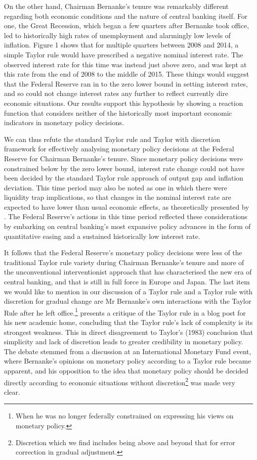 \documentclass[notitlepage,12pt]{article}
\begin{document}
On the other hand, Chairman Bernanke's tenure was remarkably different regarding both economic conditions and the nature of central banking itself.  For one, the Great Recession, which began a few quarters after Bernanke took office, led to historically high rates of unemployment and alarmingly low levels of inflation.  Figure 1 shows that for multiple quarters between 2008 and 2014, a simple Taylor rule would have prescribed a negative nominal interest rate.  The observed interest rate for this time was instead just above zero, and was kept at this rate from the end of 2008 to the middle of 2015.  These things would suggest that the Federal Reserve ran in to the zero lower bound in setting interest rates, and so could not change interest rates any further to reflect currently dire economic situations.  Our results support this hypothesis by showing a reaction function that considers neither of the historically most important economic indicators in monetary policy decisions.  

We can thus refute the standard Taylor rule and Taylor with discretion framework for effectively analysing monetary policy decisions at the Federal Reserve for Chairman Bernanke's tenure.  Since monetary policy decisions were constrained below by the zero lower bound, interest rate change could not have been decided by the standard Taylor rule approach of output gap and inflation deviation.  This time period may also be noted as one in which there were liquidity trap implications, so that changes in the nominal interest rate are expected to have lower than usual economic effects, as theoretically presented by \cite{krugman2000thinking}.  The Federal Reserve's actions in this time period reflected these considerations by embarking on central banking's most expansive policy advances in the form of quantitative easing and a sustained historically low interest rate.

It follows that the Federal Reserve's monetary policy decisions were less of the traditional Taylor rule variety during Chairman Bernanke's tenure and more of the unconventional interventionist approach that has characterised the new era of central banking, and that is still in full force in Europe and Japan.  The last item we would like to mention in our discussion of a Taylor rule and a Taylor rule with discretion for gradual change are Mr Bernanke's own interactions with the Taylor Rule after he left office.\footnote{When he was no longer federally constrained on expressing his views on monetary policy.}  \cite{bernanke_2016} presents a critique of the Taylor rule in a blog post for his new academic home, concluding that the Taylor rule's lack of complexity is its strongest weakness.  This in direct disagreement to Taylor's (1983) conclusion that simplicity and lack of discretion leads to greater credibility in monetary policy.  The debate stemmed from a discussion at an International Monetary Fund event, where Bernanke's opinions on monetary policy according to a Taylor rule became apparent, and his opposition to the idea that monetary policy should be decided directly according to economic situations without discretion\footnote{Discretion which we find includes being above and beyond that for error correction in gradual adjustment.} was made very clear.
\end{document}
